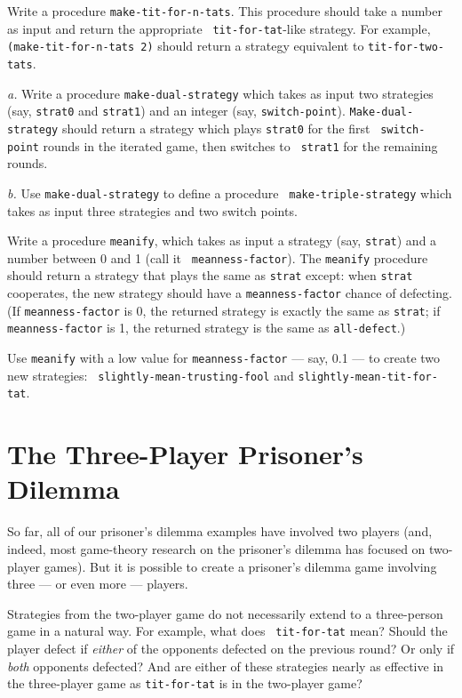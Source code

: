 \vskip 8pt


Write a procedure {\tt make-tit-for-n-tats}. This procedure should
take a number as input and return the appropriate {\tt
tit-for-tat}-like strategy.  For example, {\tt (make-tit-for-n-tats
2)} should return a strategy equivalent to {\tt tit-for-two-tats}.


\vskip 8pt


{\it a.} Write a procedure {\tt make-dual-strategy} which takes as
input two strategies (say, {\tt strat0} and {\tt strat1}) and an
integer (say, {\tt switch-point}). {\tt Make-dual-strategy} should
return a strategy which plays {\tt strat0} for the first {\tt
switch-point} rounds in the iterated game, then switches to {\tt
strat1} for the remaining rounds.

{\it b.} Use {\tt make-dual-strategy} to define a procedure {\tt
make-triple-strategy} which takes as input three strategies and two
switch points.


\vskip 8pt


Write a procedure {\tt meanify}, which takes as input a strategy (say,
{\tt strat}) and a number between 0 and 1 (call it {\tt
meanness-factor}). The {\tt meanify} procedure should return a
strategy that plays the same as {\tt strat} except: when {\tt strat}
cooperates, the new strategy should have a {\tt meanness-factor}
chance of defecting.  (If {\tt meanness-factor} is 0, the returned
strategy is exactly the same as {\tt strat}; if {\tt meanness-factor}
is 1, the returned strategy is the same as {\tt all-defect}.)

Use {\tt meanify} with a low value for {\tt meanness-factor} --- say,
0.1 --- to create two new strategies: {\tt
slightly-mean-trusting-fool} and {\tt slightly-mean-tit-for-tat}.

\section{The Three-Player Prisoner's Dilemma}

So far, all of our prisoner's dilemma examples have involved two
players (and, indeed, most game-theory research on the prisoner's
dilemma has focused on two-player games). But it is possible to create
a prisoner's dilemma game involving three --- or even more ---
players.

Strategies from the two-player game do not necessarily extend to a
three-person game in a natural way. For example, what does {\tt
tit-for-tat} mean? Should the player defect if {\it either} of the
opponents defected on the previous round? Or only if {\it both}
opponents defected? And are either of these strategies nearly as
effective in the three-player game as {\tt tit-for-tat} is in the
two-player game?

